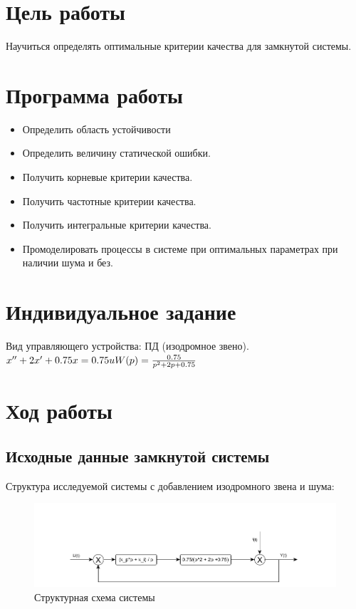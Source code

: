 





\def\contentsname{Содержание}

\tableofcontents
\clearpage

\section{Цель работы}

Научиться определять оптимальные критерии качества для замкнутой системы.

\section{Программа работы}

\begin{itemize}
	\item Определить область устойчивости
	\item Определить величину статической ошибки.
	\item Получить корневые критерии качества.
	\item Получить частотные критерии качества.
	\item Получить интегральные критерии качества.
	\item Промоделировать процессы в системе при оптимальных параметрах при наличии шума и без.
\end{itemize}

\section{Индивидуальное задание}
Вид управляющего устройства: ПД (изодромное звено).\\
$x'' + 2x' + 0.75x = 0.75u\\
W(p) = \frac{0.75}{p^2 + 2p + 0.75}$

\section{Ход работы}

\subsection{Исходные данные замкнутой системы}

Структура исследуемой системы с добавлением изодромного звена и шума:

\begin{figure}[h!]
	\centering
	\includegraphics[scale = 0.55]{images/w.png}
	\caption{Структурная схема системы}
	\label{image:1}
\end{figure}

